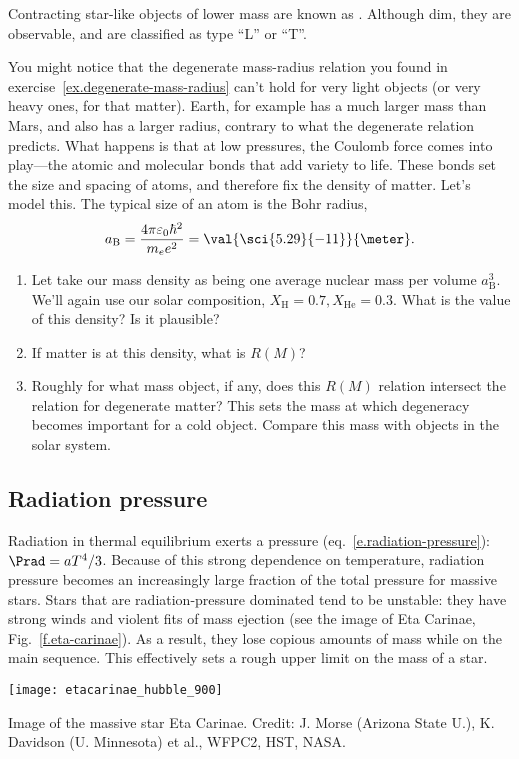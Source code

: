  Contracting star-like objects of lower mass are known as . Although dim, they are observable, and are classified as type ``L'' or ``T''\cite{Kirkpatrick1999Dwarfs-Cooler-t}.

\begin{exercisebox}
\label{ex.planetary-M-and-R}
You might notice that the degenerate mass-radius relation you found in exercise~\ref{ex.degenerate-mass-radius} can't hold for very light objects (or very heavy ones, for that matter). Earth, for example has a much larger mass than Mars, and also has a larger radius, contrary to what the degenerate relation predicts. What happens is that at low pressures, the Coulomb force comes into play---the atomic and molecular bonds that add variety to life. These bonds set the size and spacing of atoms, and therefore fix the density of matter. Let's model this. The typical size of an atom is the Bohr radius,
\[
	a_{\mathrm{B}} = \frac{4\pi\varepsilon_{0}\hbar^{2}}{m_{e}e^{2}} = \val{\sci{5.29}{-11}}{\meter}.
\]
	\begin{enumerate}
	\item Let take our mass density as being one average nuclear mass per volume $a_{\mathrm{B}}^{3}$.  We'll again use our solar composition, $X_{\mathrm{H}}=0.7, X_{\mathrm{He}}=0.3$.
What is the value of this density? Is it plausible?
	\item If matter is at this density, what is $R(M)$?
	\item Roughly for what mass object, if any, does this $R(M)$ relation intersect the relation for degenerate matter? This sets the mass at which degeneracy becomes important for a cold object. Compare this mass with objects in the solar system.
	\end{enumerate}
\end{exercisebox}

\subsection{Radiation pressure}
\label{s.radiation-pressure}

Radiation in thermal equilibrium exerts a pressure (eq.~\ref{e.radiation-pressure}): $\Prad = aT^{4}/3$. Because of this strong dependence on temperature, radiation pressure becomes an increasingly large fraction of the total pressure for massive stars. Stars that are radiation-pressure dominated tend to be unstable: they have strong winds and violent fits of mass ejection (see the image of Eta Carinae, Fig.~\ref{f.eta-carinae}). As a result, they lose copious amounts of mass while on the main sequence. This effectively sets a rough upper limit on the mass of a star.
\begin{marginfigure}
\texttt{[image: etacarinae\_hubble\_900]}
\caption[Image of the massive star Eta Carinae]{\label{f.eta-carinae} Image of the massive star Eta Carinae. Credit: J. Morse (Arizona State U.), K. Davidson (U. Minnesota) et al., WFPC2, HST, NASA.}
\end{marginfigure}


